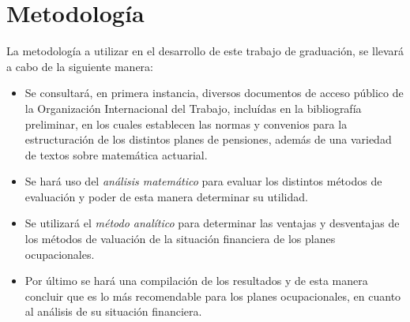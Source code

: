 \documentclass[12pt,letterpaper,titlepage]{article}
\begin{document}
\newpage

\section{Metodología}

La metodología a utilizar en el desarrollo de este trabajo de graduación, se llevará a cabo de la siguiente manera:

\begin{itemize}
	\item Se consultará, en primera instancia, diversos documentos de acceso público de la Organización Internacional del Trabajo, incluídas en la bibliografía preliminar,  en los cuales establecen las normas y convenios para la estructuración de los distintos planes de pensiones, además de una variedad de textos sobre matemática actuarial.
	
	\item Se hará uso del \textit{análisis matemático} para evaluar los distintos métodos de evaluación y poder de esta manera determinar su utilidad.
	 
	\item Se utilizará el \textit{método analítico} para determinar las ventajas y desventajas de los métodos de valuación de la situación financiera de los planes ocupacionales.
	
	\item Por último se hará una compilación de los resultados y de esta manera concluir que es lo más recomendable para los planes ocupacionales, en cuanto al análisis de su situación financiera.
\end{itemize}


\newpage
\end{document}
